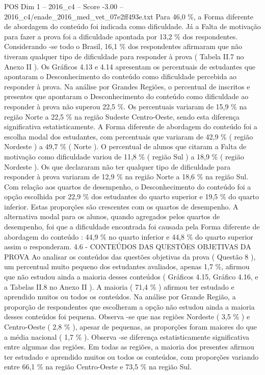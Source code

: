 \begin{textsample}{POS Dim 1 – 2016\_c4 – Score -3.00 – 2016\_c4/enade\_2016\_med\_vet\_07e2ff493e.txt}
Para 46,0 \%, a Forma diferente de abordagem do conteúdo foi indicada como dificuldade.
Já a Falta de motivação para fazer a prova foi a dificuldade apontada por 13,2 \% dos respondentes.
Considerando -se todo o Brasil, 16,1 \% dos respondentes afirmaram que não tiveram qualquer tipo de dificuldade para responder à prova ( Tabela II.7 no Anexo II ).
Os Gráficos 4.13 e 4.14 apresentam os percentuais de estudantes que apontaram o Desconhecimento do conteúdo como dificuldade percebida ao responder à prova.
Na análise por Grandes Regiões, o percentual de inscritos e presentes que apontaram o Desconhecimento do conteúdo como dificuldade ao responder à prova não superou 22,5 \%.
Os percentuais variaram de 15,9 \% na região Norte a 22,5 \% na região Sudeste Centro-Oeste, sendo esta diferença significativa estatisticamente.
A Forma diferente de abordagem do conteúdo foi a escolha modal dos estudantes, com percentuais que variaram de 42,9 \% ( região Nordeste ) a 49,7 \% ( Norte ).
O percentual de alunos que citaram a Falta de motivação como dificuldade variou de 11,8 \% ( região Sul ) a 18,9 \% ( região Nordeste ).
Os que declararam não ter qualquer tipo de dificuldade para responder à prova variaram de 12,9 \% na região Norte a 18,6 \% na região Sul.
Com relação aos quartos de desempenho, o Desconhecimento do conteúdo foi a opção escolhida por 22,9 \% dos estudantes do quarto superior e 19,5 \% do quarto inferior.
Estas proporções são crescentes com os quartos de desempenho.
A alternativa modal para os alunos, quando agregados pelos quartos de desempenho, foi que a dificuldade encontrada foi causada pela Forma diferente de abordagem do conteúdo : 44,9 \% no quarto inferior e 44,8 \% do quarto superior assim o responderam. 4.6 - CONTEÚDOS DAS QUESTÕES OBJETIVAS DA PROVA Ao analisar os conteúdos das questões objetivas da prova ( Questão 8 ), um percentual muito pequeno dos estudantes avaliados, apenas 1,7 \%, afirmou que não estudou ainda a maioria desses conteúdos ( Gráficos 4.15, Gráfico 4.16, e a Tabelas II.8 no Anexo II ).
A maioria ( 71,4 \% ) afirmou ter estudado e aprendido muitos ou todos os conteúdos.
Na análise por Grande Região, a proporção de respondentes que escolheram a opção não estudou ainda a maioria desses conteúdos foi pequena.
Observa -se que nas regiões Nordeste ( 3,5 \% ) e Centro-Oeste ( 2,8 \% ), apesar de pequenas, as proporções foram maiores do que a média nacional ( 1,7 \% ).
Observa -se diferença estatisticamente significativa entre algumas das regiões.
Em todas as regiões, a maioria dos presentes afirmou ter estudado e aprendido muitos ou todos os conteúdos, com proporções variando entre 66,1 \% na região Centro-Oeste e 73,5 \% na região Sul.

\end{textsample}
